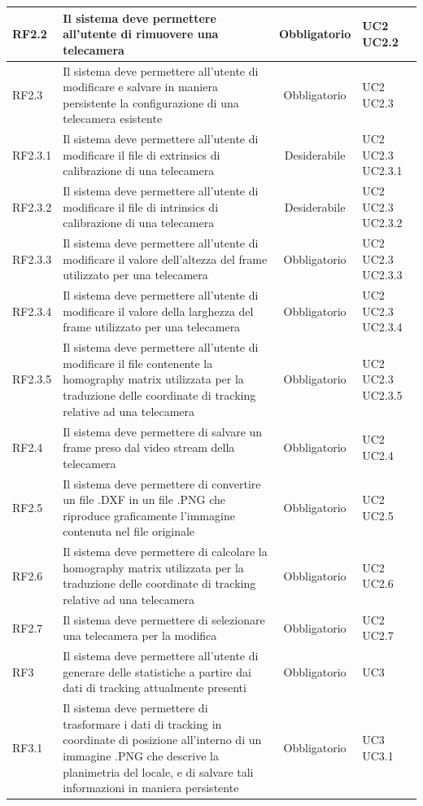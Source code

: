 \begin{center}
\begin{longtable}{ | l | p{5cm} | c | p{1.5cm} |}
    \\ \hline
    RF2.2 & Il sistema deve permettere all'utente di rimuovere una telecamera & Obbligatorio & UC2 UC2.2
    \\ \hline
    RF2.3 & Il sistema deve permettere all'utente di modificare e salvare in maniera persistente la configurazione di una telecamera esistente & Obbligatorio & UC2 UC2.3
    \\ \hline
    RF2.3.1 & Il sistema deve permettere all'utente di modificare il file di extrinsics di calibrazione di una telecamera & Desiderabile & UC2 UC2.3 UC2.3.1
    \\ \hline
    RF2.3.2 & Il sistema deve permettere all'utente di modificare il file di intrinsics di calibrazione di una telecamera & Desiderabile & UC2 UC2.3 UC2.3.2
    \\ \hline
    RF2.3.3 & Il sistema deve permettere all'utente di modificare il valore dell'altezza del frame utilizzato per una telecamera & Obbligatorio & UC2 UC2.3 UC2.3.3
    \\ \hline
    RF2.3.4 & Il sistema deve permettere all'utente di modificare il valore della larghezza del frame utilizzato per una telecamera & Obbligatorio & UC2 UC2.3 UC2.3.4
    \\ \hline
    RF2.3.5 & Il sistema deve permettere all'utente di modificare il file contenente la homography matrix utilizzata per la traduzione delle coordinate di tracking relative ad una telecamera & Obbligatorio & UC2 UC2.3 UC2.3.5
    \\ \hline
    RF2.4 & Il sistema deve permettere di salvare un frame preso dal video stream della telecamera & Obbligatorio & UC2 UC2.4
    \\ \hline
    RF2.5 & Il sistema deve permettere di convertire un file .DXF in un file .PNG che riproduce graficamente l'immagine contenuta nel file originale & Obbligatorio & UC2 UC2.5
    \\ \hline
    RF2.6 & Il sistema deve permettere di calcolare la homography matrix utilizzata per la traduzione delle coordinate di tracking relative ad una telecamera & Obbligatorio & UC2 UC2.6
    \\ \hline
    RF2.7 & Il sistema deve permettere di selezionare una telecamera per la modifica & Obbligatorio & UC2 UC2.7
    \\ \hline
    RF3 & Il sistema deve permettere all'utente di generare delle statistiche a partire dai dati di tracking attualmente presenti & Obbligatorio & UC3
    \\ \hline
    RF3.1 & Il sistema deve permettere di trasformare i dati di tracking in coordinate di posizione all'interno di un immagine .PNG che descrive la planimetria del locale, e di salvare tali informazioni in maniera persistente & Obbligatorio & UC3 UC3.1

\end{longtable}
\end{center}
